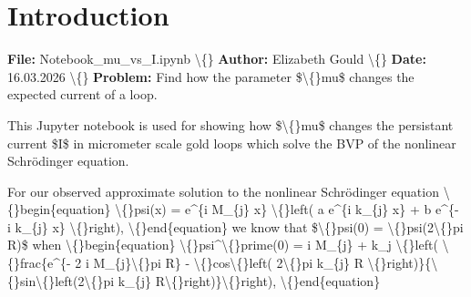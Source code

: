 \documentclass{article}
\begin{document}
\section{Introduction}


\textbf{File:} Notebook\_mu\_vs\_I.ipynb 
\textbackslash\{\}
\textbf{Author:} Elizabeth Gould
\textbackslash\{\}
\textbf{Date:} 16.03.2026
\textbackslash\{\}
\textbf{Problem:} Find how the parameter \$\textbackslash\{\}mu\$ changes the expected current of a loop.

This Jupyter notebook is used for showing how \$\textbackslash\{\}mu\$ changes the persistant current \$I\$ in micrometer scale gold loops which solve the BVP of the nonlinear Schr\"{o}dinger equation. 

For our observed approximate solution to the nonlinear Schr\"{o}dinger equation
\textbackslash\{\}begin\{equation\}
\textbackslash\{\}psi(x) = e\textasciicircum{}\{i M\_\{j\} x\} \textbackslash\{\}left( a e\textasciicircum{}\{i k\_\{j\} x\} + b e\textasciicircum{}\{- i k\_\{j\} x\} \textbackslash\{\}right),
\textbackslash\{\}end\{equation\}
we know that \$\textbackslash\{\}psi(0) = \textbackslash\{\}psi(2\textbackslash\{\}pi R)\$ when 
\textbackslash\{\}begin\{equation\}
\textbackslash\{\}psi\textasciicircum{}\textbackslash\{\}prime(0) = i M\_\{j\} + k\_j \textbackslash\{\}left( \textbackslash\{\}frac\{e\textasciicircum{}\{- 2 i M\_\{j\}\textbackslash\{\}pi R\} - \textbackslash\{\}cos\textbackslash\{\}left( 2\textbackslash\{\}pi k\_\{j\} R \textbackslash\{\}right)\}\{\textbackslash\{\}sin\textbackslash\{\}left(2\textbackslash\{\}pi k\_\{j\} R\textbackslash\{\}right)\}\textbackslash\{\}right),
\textbackslash\{\}end\{equation\}
\end{document}
